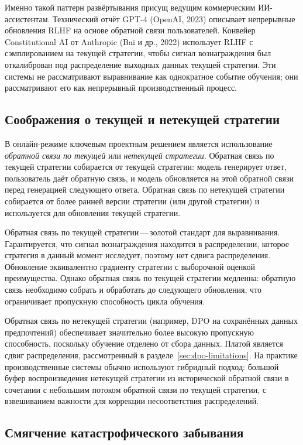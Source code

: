 Именно такой паттерн развёртывания присущ ведущим коммерческим ИИ-ассистентам. Технический отчёт GPT-4 (OpenAI, 2023) описывает непрерывные обновления RLHF на основе обратной связи пользователей. Конвейер Constitutional AI от Anthropic (Bai и др., 2022) использует RLHF с сэмплированием на текущей стратегии, чтобы сигнал вознаграждения был откалиброван под распределение выходных данных текущей стратегии. Эти системы не рассматривают выравнивание как однократное событие обучения; они рассматривают его как непрерывный производственный процесс.

\subsection{Соображения о текущей и нетекущей стратегии}

В онлайн-режиме ключевым проектным решением является использование \emph{обратной связи по текущей} или \emph{нетекущей стратегии}. Обратная связь по текущей стратегии собирается от текущей стратегии: модель генерирует ответ, пользователь даёт обратную связь, и модель обновляется на этой обратной связи перед генерацией следующего ответа. Обратная связь по нетекущей стратегии собирается от более ранней версии стратегии (или другой стратегии) и используется для обновления текущей стратегии.

Обратная связь по текущей стратегии\,---\,золотой стандарт для выравнивания. Гарантируется, что сигнал вознаграждения находится в распределении, которое стратегия в данный момент исследует, поэтому нет сдвига распределения. Обновление эквивалентно градиенту стратегии с выборочной оценкой преимущества. Однако обратная связь по текущей стратегии медленна: обратную связь необходимо собрать и обработать до следующего обновления, что ограничивает пропускную способность цикла обучения.

Обратная связь по нетекущей стратегии (например, DPO на сохранённых данных предпочтений) обеспечивает значительно более высокую пропускную способность, поскольку обучение отделено от сбора данных. Платой является сдвиг распределения, рассмотренный в разделе~\ref{sec:dpo-limitations}. На практике производственные системы обычно используют гибридный подход: большой буфер воспроизведения нетекущей стратегии из исторической обратной связи в сочетании с небольшим потоком обратной связи по текущей стратегии, с взвешиванием важности для коррекции несоответствия распределений.

\subsection{Смягчение катастрофического забывания}

